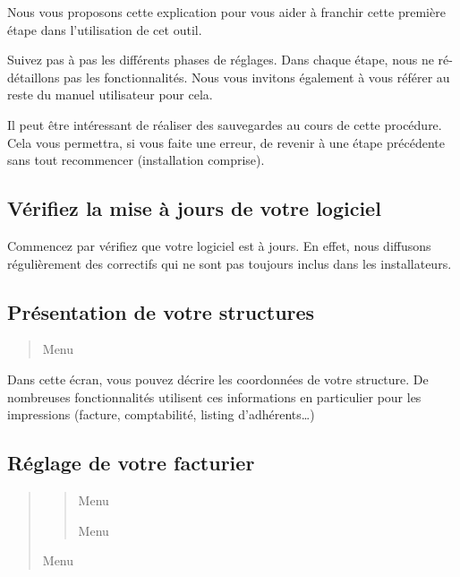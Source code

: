 \documentclass[a4paper,10pt,oneside,french]{sphinxmanual}
\begin{document}
Nous vous proposons cette explication pour vous aider à franchir cette première étape dans l’utilisation de cet outil.

Suivez pas à pas les différents phases de réglages. Dans chaque étape, nous ne ré-détaillons pas les fonctionnalités.
Nous vous invitons également à vous référer au reste du manuel utilisateur pour cela.

Il peut être intéressant de réaliser des sauvegardes au cours de cette procédure.
Cela vous permettra, si vous faite une erreur, de revenir à une étape précédente sans tout recommencer (installation comprise).


\subsection{Vérifiez la mise à jours de votre logiciel}
\label{\detokenize{pro/first_step:verifiez-la-mise-a-jours-de-votre-logiciel}}
Commencez par vérifiez que votre logiciel est à jours.
En effet, nous diffusons régulièrement des correctifs qui ne sont pas toujours inclus dans les installateurs.


\subsection{Présentation de votre structures}
\label{\detokenize{pro/first_step:presentation-de-votre-structures}}\begin{quote}

Menu 
\end{quote}

Dans cette écran, vous pouvez décrire les coordonnées de votre structure.
De nombreuses fonctionnalités utilisent ces informations en particulier pour les impressions (facture, comptabilité, listing d’adhérents…)


\subsection{Réglage de votre facturier}
\label{\detokenize{pro/first_step:reglage-de-votre-facturier}}\begin{quote}
\begin{quote}

Menu 

Menu 
\end{quote}

Menu 
\end{quote}
\end{document}
